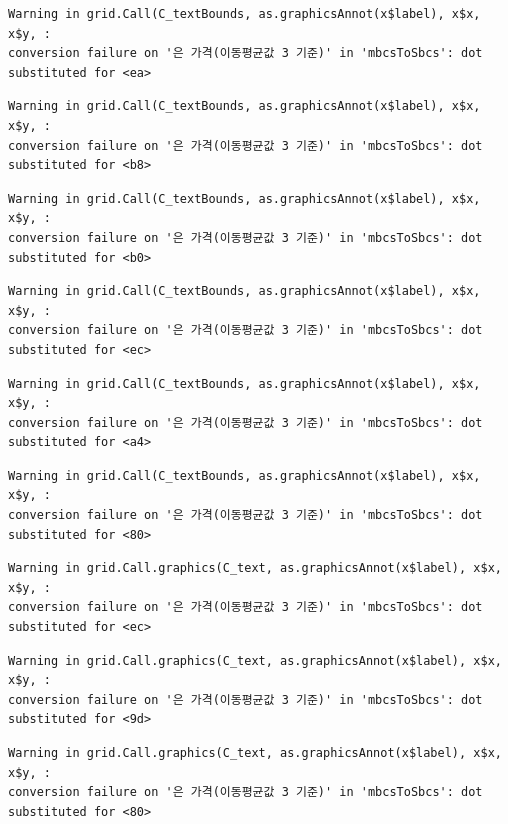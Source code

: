 \documentclass[
  letterpaper,
  DIV=11,
  numbers=noendperiod]{scrreprt}
\begin{document}
\begin{verbatim}
Warning in grid.Call(C_textBounds, as.graphicsAnnot(x$label), x$x, x$y, :
conversion failure on '은 가격(이동평균값 3 기준)' in 'mbcsToSbcs': dot
substituted for <ea>
\end{verbatim}

\begin{verbatim}
Warning in grid.Call(C_textBounds, as.graphicsAnnot(x$label), x$x, x$y, :
conversion failure on '은 가격(이동평균값 3 기준)' in 'mbcsToSbcs': dot
substituted for <b8>
\end{verbatim}

\begin{verbatim}
Warning in grid.Call(C_textBounds, as.graphicsAnnot(x$label), x$x, x$y, :
conversion failure on '은 가격(이동평균값 3 기준)' in 'mbcsToSbcs': dot
substituted for <b0>
\end{verbatim}

\begin{verbatim}
Warning in grid.Call(C_textBounds, as.graphicsAnnot(x$label), x$x, x$y, :
conversion failure on '은 가격(이동평균값 3 기준)' in 'mbcsToSbcs': dot
substituted for <ec>
\end{verbatim}

\begin{verbatim}
Warning in grid.Call(C_textBounds, as.graphicsAnnot(x$label), x$x, x$y, :
conversion failure on '은 가격(이동평균값 3 기준)' in 'mbcsToSbcs': dot
substituted for <a4>
\end{verbatim}

\begin{verbatim}
Warning in grid.Call(C_textBounds, as.graphicsAnnot(x$label), x$x, x$y, :
conversion failure on '은 가격(이동평균값 3 기준)' in 'mbcsToSbcs': dot
substituted for <80>
\end{verbatim}

\begin{verbatim}
Warning in grid.Call.graphics(C_text, as.graphicsAnnot(x$label), x$x, x$y, :
conversion failure on '은 가격(이동평균값 3 기준)' in 'mbcsToSbcs': dot
substituted for <ec>
\end{verbatim}

\begin{verbatim}
Warning in grid.Call.graphics(C_text, as.graphicsAnnot(x$label), x$x, x$y, :
conversion failure on '은 가격(이동평균값 3 기준)' in 'mbcsToSbcs': dot
substituted for <9d>
\end{verbatim}

\begin{verbatim}
Warning in grid.Call.graphics(C_text, as.graphicsAnnot(x$label), x$x, x$y, :
conversion failure on '은 가격(이동평균값 3 기준)' in 'mbcsToSbcs': dot
substituted for <80>
\end{verbatim}
\end{document}

